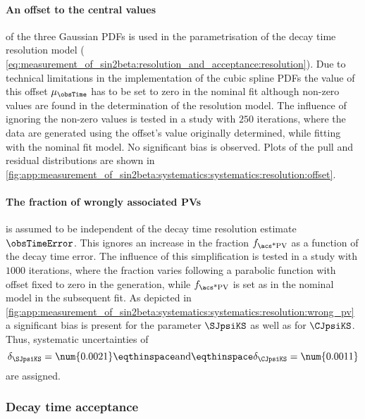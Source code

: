 \paragraph{An offset to the central values} of the three Gaussian \acp{PDF} is
used in the parametrisation of the decay time resolution model (\cf
\cref{eq:measurement_of_sin2beta:resolution_and_acceptance:resolution}). Due to
technical limitations in the implementation of the cubic spline \acp{PDF} the
value of this offset $\mu_{\obsTime}$ has to be set to zero in the nominal fit
although non-zero values are found in the determination of the resolution model.
The influence of ignoring the non-zero values is tested in a \ToyMC study with
$\num{250}$ iterations, where the data are generated using the offset's value
originally determined, while fitting with the nominal fit model. No significant
bias is observed. Plots of the pull and residual distributions are shown in
\cref{fig:app:measurement_of_sin2beta:systematics:systematics:resolution:offset}.

\paragraph{The fraction of wrongly associated \acp{PV}} is assumed to be
independent of the decay time resolution estimate $\obsTimeError$. This ignores
an increase in the fraction $f_\text{\acs*{PV}}$ as a function of the decay time
error. The influence of this simplification is tested in a \ToyMC study with
$\num{1000}$ iterations, where the fraction varies following a parabolic
function with offset fixed to zero in the generation, while $f_\text{\acs*{PV}}$
is set as in the nominal model in the subsequent fit. As depicted in
\cref{fig:app:measurement_of_sin2beta:systematics:systematics:resolution:wrong_pv} 
a significant bias is present for the parameter $\SJpsiKS$ as well as for
$\CJpsiKS$. Thus, systematic uncertainties of
%
\begin{equation}
  \delta_{\SJpsiKS} = \num{0.0021}\eqthinspace\text{and}\eqthinspace\delta_{\CJpsiKS} = \num{0.0011}
\end{equation}
%
are assigned.

\subsubsection{Decay time acceptance}
\label{sec:measurement_of_sin2beta:systematics:systematics:acceptance}

